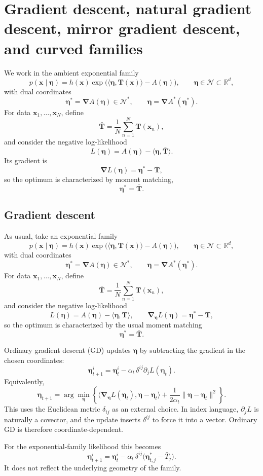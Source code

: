 \documentclass[11pt]{article}
\newcommand{\R}{\mathbb{R}}
\newcommand{\be}{{\bm{\eta}}}
\newcommand{\bx}{\bm{x}}
\newcommand{\bT}{\bm{T}}
\newcommand{\bNabla}{\bm{\nabla}}
\begin{document}
\section{Gradient descent, natural gradient descent, mirror gradient descent, and curved families}

We work in the ambient exponential family
\[
p(\bx\mid \be)=h(\bx)\exp\!\big(\langle \be,\bT(\bx)\rangle-A(\be)\big),
\qquad
\be\in\mathcal N\subset\R^d,
\]
with dual coordinates 
\[
\be^\ast=\bNabla A(\be)\in\mathcal N^\ast,
\qquad
\be=\bNabla A^\ast(\be^\ast).
\]
For data \(\bx_1,\dots,\bx_N\), define
\[
\bar{\bT}=\frac{1}{N}\sum_{n=1}^N \bT(\bx_n),
\]
and consider the negative log-likelihood
\[
L(\be)=A(\be)-\langle \be,\bar{\bT}\rangle.
\]
Its gradient is
\[
\bNabla L(\be)=\be^\ast-\bar{\bT},
\]
so the optimum is characterized by moment matching,
\[
\be^\ast=\bar{\bT}.
\]

\subsection{Gradient descent}

As usual, take an exponential family
\[
p(\bx\mid \be)=h(\bx)\exp\!\big(\langle \be,\bT(\bx)\rangle-A(\be)\big),
\qquad
\be\in\mathcal N\subset\R^d,
\]
with dual coordinates
\[
\be^\ast=\bNabla A(\be)\in\mathcal N^\ast,
\qquad
\be=\bNabla A^\ast(\be^\ast).
\]
For data \(\bx_1,\dots,\bx_N\), define
\[
\bar{\bT}=\frac{1}{N}\sum_{n=1}^N \bT(\bx_n),
\]
and consider the negative log-likelihood
\[
L(\be)=A(\be)-\langle \be,\bar{\bT}\rangle,
\qquad
\bNabla_\be L(\be)=\be^\ast-\bar{\bT},
\]
so the optimum is characterized by the usual moment matching
\[
\be^\ast=\bar{\bT}.
\]

Ordinary gradient descent (GD) updates \(\be\) by subtracting the gradient in the chosen coordinates:
\[
\be^i_{t+1}
=
\be^i_t-\alpha_t\,\delta^{ij}\partial_jL(\be_t).
\]
Equivalently,
\[
\be_{t+1}
=
\arg\min_{\be}
\left\{
\langle \bNabla_\be L(\be_t),\be-\be_t\rangle
+\frac{1}{2\alpha_t}\|\be-\be_t\|^2
\right\}.
\]
This uses the Euclidean metric \(\delta_{ij}\) as an external choice. In index language, \(\partial_jL\) is naturally a covector, and the update inserts \(\delta^{ij}\) to force it into a vector. Ordinary GD is therefore coordinate-dependent.

For the exponential-family likelihood this becomes
\[
\be^i_{t+1}
=
\be^i_t-\alpha_t\,\delta^{ij}\bigl(\be^\ast_{t,j}-\bar T_j\bigr).
\]
It does not reflect the underlying geometry of the family.
\end{document}
